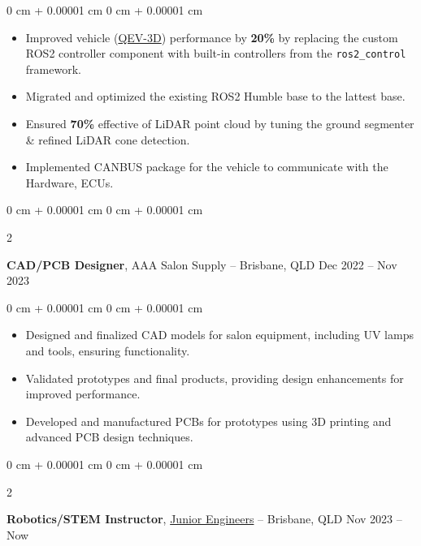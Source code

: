 \documentclass[10pt, letterpaper]{article}
\newenvironment{highlights}{
    \begin{itemize}[
        topsep=0.10 cm,
        parsep=0.10 cm,
        partopsep=0pt,
        itemsep=0pt,
        leftmargin=0 cm + 10pt
    ]
}{
    \end{itemize}
} %
\newenvironment{onecolentry}{
    \begin{adjustwidth}{
        0 cm + 0.00001 cm
    }{
        0 cm + 0.00001 cm
    }
}{
    \end{adjustwidth}
} %
\newenvironment{twocolentry}[2][]{
    \onecolentry
    \def\secondColumn{#2}
    \setcolumnwidth{\fill, 4.5 cm}
    \begin{paracol}{2}
}{
    \switchcolumn \raggedleft \secondColumn
    \end{paracol}
    \endonecolentry
} %
\begin{document}
\vspace{0.10 cm}
\begin{onecolentry}

      \begin{highlights}
            \item Improved vehicle (\href{https://qutmotorsport.com/qev-3d/}{QEV-3D}) performance
            by \textbf{20\%} by replacing the custom ROS2 controller component with
            built-in controllers from the \texttt{ros2\_control} framework.
            \item Migrated and optimized the existing ROS2 Humble base to the lattest base.
            \item Ensured \textbf{70\%} effective of LiDAR point cloud by tuning the ground
            segmenter \& refined LiDAR cone detection.
            \item Implemented CANBUS package for the vehicle to communicate with the Hardware,
            ECUs.

      \end{highlights}
\end{onecolentry}

\vspace{0.4 cm}

\begin{twocolentry}{
            Dec 2022 – Nov 2023
      }
      \textbf{CAD/PCB Designer}, AAA Salon Supply -- Brisbane, QLD\end{twocolentry}

\vspace{0.10 cm}
\begin{onecolentry}
      \begin{highlights}
            \item Designed and finalized CAD models for salon equipment, including UV lamps and
            tools, ensuring functionality.
            \item Validated prototypes and final products, providing design enhancements for
            improved performance.
            \item Developed and manufactured PCBs for prototypes using 3D printing and advanced
            PCB design techniques.
      \end{highlights}
\end{onecolentry}

\vspace{0.4 cm}

\begin{twocolentry}{
            Nov 2023 – Now
      }
      \textbf{Robotics/STEM Instructor}, \href{https://www.juniorengineers.com.au/}{Junior Engineers} -- Brisbane, QLD\end{twocolentry}
\end{document}
